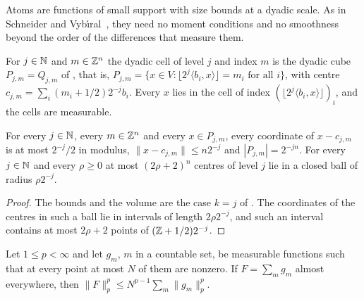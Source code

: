 Atoms are functions of small support with size bounds at a dyadic scale. As in Schneider and
Vyb\'{\i}ral~\cite{SchneiderVybiral}, they need no moment conditions and no smoothness beyond the
order of the differences that measure them.

\begin{definition}
\label{def:dyadic-cells}
\leanok
{}
For $j \in \mathbb{N}$ and $m \in \mathbb{Z}^n$ the dyadic cell of level $j$ and index $m$ is the dyadic cube
$P_{j,m} = Q_{j,m}$ of , that is,
$P_{j,m} = \{x \in V : \lfloor 2^j \langle b_i, x \rangle \rfloor = m_i \text{ for all } i\}$,
with centre $c_{j,m} = \sum_i (m_i + 1/2) 2^{-j} b_i$. Every $x$ lies in the cell of index
$(\lfloor 2^j \langle b_i, x \rangle \rfloor)_i$, and the cells are measurable.
\end{definition}

\begin{lemma}
\label{lem:dyadic-cells}
\leanok
{}
For every $j \in \mathbb{N}$, every $m \in \mathbb{Z}^n$ and every $x \in P_{j,m}$, every coordinate of
$x - c_{j,m}$ is at most $2^{-j}/2$ in modulus, $\|x - c_{j,m}\| \leq n 2^{-j}$ and
$|P_{j,m}| = 2^{-jn}$. For every $j \in \mathbb{N}$ and every $\rho \geq 0$ at most $(2\rho + 2)^n$
centres of level $j$ lie in a closed ball of radius $\rho 2^{-j}$.
\end{lemma}

\begin{proof}
\leanok
The bounds and the volume are the case $k = j$ of . The coordinates of
the centres in such a ball lie in intervals of length $2 \rho 2^{-j}$, and such
an interval contains at most $2\rho + 2$ points of $(\mathbb{Z} + 1/2) 2^{-j}$.
\end{proof}

\begin{lemma}
\label{lem:bounded-overlap}
\leanok
Let $1 \leq p < \infty$ and let $g_m$, $m$ in a countable set, be measurable functions such that at
every point at most $N$ of them are nonzero. If $F = \sum_m g_m$ almost everywhere, then
$\|F\|_p^p \leq N^{p-1} \sum_m \|g_m\|_p^p$.
\end{lemma}

